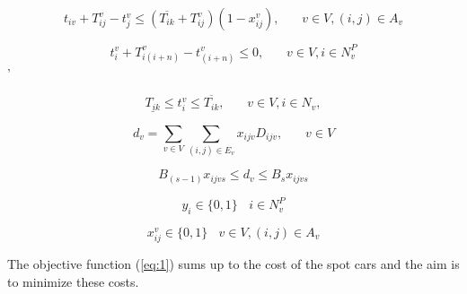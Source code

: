 \documentclass[a4paper,12pt]{article}
\begin{document}
\begin{equation} \label{eq:14}
t_{iv} + T_{ij}^v - t_{j}^v \leq (\overline{T_{ik}} + T_{ij}^v)(1 - x_{ij}^v), ~~~~~~~~ v \in V, (i,j) \in A_v
\end{equation}

\begin{equation} \label{eq:15}
    t_{i}^v + T_{i(i+n)}^v - t_{(i+n)}^v \leq 0, ~~~~~~~~ v \in V, i \in N^P_v
\end{equation}'

\begin{equation} \label{eq:16}
  \underline{T_{ik}} \leq t_{i}^v \leq  \overline{T_{ik}}, ~~~~~~~~ v \in V, i \in N_v,
\end{equation}


\begin{equation} \label{eq:17}
    d_v = \sum_{v \in V} \sum_{(i,j) \in E_v} x_{ijv}D_{ijv},~~~~~~~~ v \in V
\end{equation}

\begin{equation} \label{eq:18}
    B_{(s-1)}x_{ijvs} \leq d_v \leq B_sx_{ijvs}
\end{equation}

\begin{equation} \label{eq:19}
y_i \in \{0, 1\} ~~~~ i \in N_v^P
\end{equation}


\begin{equation} \label{eq:20}
x_{ij}^v \in \{0, 1\} ~~~~ v \in V, (i, j) \in A_v
\end{equation}




\par
The objective function (\ref{eq:1}) sums up to the cost of the spot cars and the aim is to minimize these costs. \newline \newline
\end{document}
